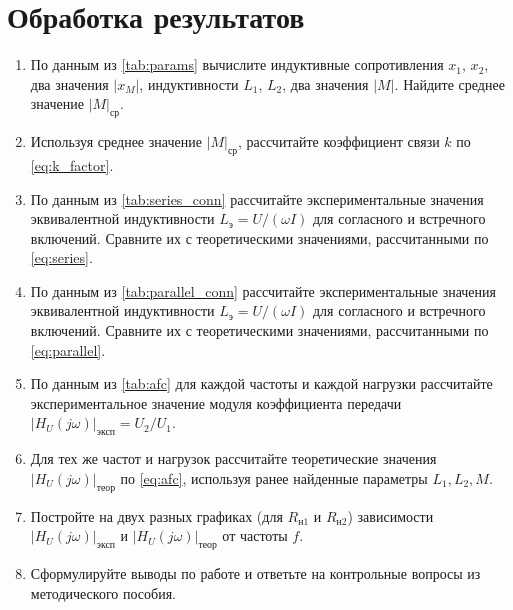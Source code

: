 \section{Обработка результатов}
\begin{enumerate}
    \item По данным из \cref{tab:params} вычислите индуктивные сопротивления $x_1$, $x_2$, два значения $|x_M|$, индуктивности $L_1$, $L_2$, два значения $|M|$. Найдите среднее значение $|M|_\text{ср}$.
    \item Используя среднее значение $|M|_\text{ср}$, рассчитайте коэффициент связи $k$ по \cref{eq:k_factor}.
    \item По данным из \cref{tab:series_conn} рассчитайте экспериментальные значения эквивалентной индуктивности $L_\text{э} = U / (\omega I)$ для согласного и встречного включений. Сравните их с теоретическими значениями, рассчитанными по \cref{eq:series}.
    \item По данным из \cref{tab:parallel_conn} рассчитайте экспериментальные значения эквивалентной индуктивности $L_\text{э} = U / (\omega I)$ для согласного и встречного включений. Сравните их с теоретическими значениями, рассчитанными по \cref{eq:parallel}.
    \item По данным из \cref{tab:afc} для каждой частоты и каждой нагрузки рассчитайте экспериментальное значение модуля коэффициента передачи $|H_U(j\omega)|_\text{эксп} = U_2 / U_1$.
    \item Для тех же частот и нагрузок рассчитайте теоретические значения $|H_U(j\omega)|_\text{теор}$ по \cref{eq:afc}, используя ранее найденные параметры $L_1, L_2, M$.
    \item Постройте на двух разных графиках (для $R_{\text{н}1}$ и $R_{\text{н}2}$) зависимости $|H_U(j\omega)|_\text{эксп}$ и $|H_U(j\omega)|_\text{теор}$ от частоты $f$.
    \item Сформулируйте выводы по работе и ответьте на контрольные вопросы из методического пособия.
\end{enumerate}

